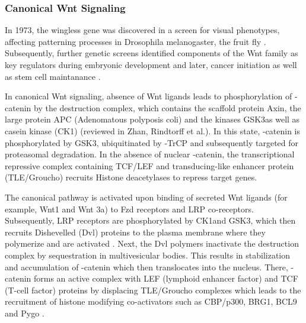 \begin{flushleft}
\subsubsection{Canonical Wnt Signaling}

In 1973, the wingless gene was discovered in a screen for visual phenotypes, affecting patterning processes in Drosophila melanogaster, the fruit fly \cite{Sharma1973WinglessMelanogaster.}. Subsequently, further genetic screens identified components of the Wnt family as key regulators during embryonic development and later, cancer initiation as well as stem cell maintanance  \cite{Nusslein-Volhard1980MutationsDrosophila}. \par 

In canonical Wnt signaling, absence of Wnt ligands leads to phosphorylation of \textbeta-catenin by the destruction complex, which contains the scaffold protein Axin, the large protein APC (Adenomatous polyposis coli) and the kinases GSK3\textbeta as well as casein kinase (CK1\textalpha) (reviewed in Zhan, Rindtorff et al.\cite{Zhan2017}). 
In this state, \textbeta-catenin is phosphorylated by GSK3\textbeta, ubiquitinated by \textbeta-TrCP and subsequently targeted for proteasomal degradation. 
In the absence of nuclear \textbeta-catenin, the transcriptional repressive complex containing TCF/LEF and transducing-like enhancer protein (TLE/Groucho) recruits Histone deacetylases to repress target genes. \par 

The canonical pathway is activated upon binding of secreted Wnt ligands (for example, Wnt1 and Wnt 3a) to Fzd receptors and LRP co-receptors. 
Subsequently, LRP receptors are  phosphorylated by CK1\textalpha and GSK3\textbeta, which then recruits Dishevelled (Dvl) proteins to the plasma membrane where they polymerize and are activated \cite{Metcalfe2011}. Next, the Dvl polymers inactivate the destruction complex by sequestration in multivesicular bodies. This results in stabilization and accumulation of \textbeta-catenin which then translocates into the nucleus. There, \textbeta-catenin forms an active complex with LEF (lymphoid enhancer factor) and TCF (T-cell factor) proteins by displacing TLE/Groucho complexes which leads to the recruitment of histone modifying co-activators such as CBP/p300, BRG1, BCL9 and Pygo \cite{Lien2014WntSignaling}. \par 


\end{flushleft}
